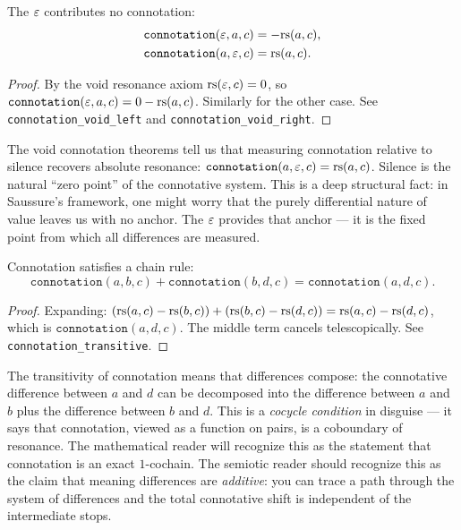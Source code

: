 \begin{theorem}
\label{thm:connotation-void}
The $\varepsilon$ contributes no connotation:
\begin{align}
  \texttt{connotation}(\varepsilon, a, c) &= -\mathrm{rs}(a, c), \\
  \texttt{connotation}(a, \varepsilon, c) &= \mathrm{rs}(a, c).
\end{align}
\end{theorem}

\begin{proof}
By the void resonance axiom $\mathrm{rs}(\varepsilon, c) = 0$, so
$\texttt{connotation}(\varepsilon, a, c) = 0 - \mathrm{rs}(a, c)$. Similarly for
the other case. See \texttt{connotation\_void\_left} and
\texttt{connotation\_void\_right}.
\end{proof}

\begin{interpretation}
The void connotation theorems tell us that measuring connotation
relative to silence recovers absolute resonance:
$\texttt{connotation}(a, \varepsilon, c) = \mathrm{rs}(a, c)$. Silence is the
natural ``zero point'' of the connotative system. This is a deep
structural fact: in Saussure's framework, one might worry that the
purely differential nature of value leaves us with no anchor. The
$\varepsilon$ provides that anchor --- it is the fixed point from which all
differences are measured.
\end{interpretation}

\begin{theorem}
\label{thm:connotation-transitive}
Connotation satisfies a chain rule:
\[
  \texttt{connotation}(a, b, c) + \texttt{connotation}(b, d, c)
  = \texttt{connotation}(a, d, c).
\]
\end{theorem}

\begin{proof}
Expanding:
$(\mathrm{rs}(a,c) - \mathrm{rs}(b,c)) + (\mathrm{rs}(b,c) - \mathrm{rs}(d,c)) = \mathrm{rs}(a,c) - \mathrm{rs}(d,c)$,
which is $\texttt{connotation}(a, d, c)$. The middle term cancels
telescopically. See \texttt{connotation\_transitive}.
\end{proof}

\begin{interpretation}
The transitivity of connotation means that differences compose: the
connotative difference between $a$ and $d$ can be decomposed into the
difference between $a$ and $b$ plus the difference between $b$ and $d$.
This is a \emph{cocycle condition} in disguise --- it says that
connotation, viewed as a function on pairs, is a coboundary of
resonance. The mathematical reader will recognize this as the
statement that connotation is an exact $1$-cochain. The semiotic
reader should recognize this as the claim that meaning differences are
\emph{additive}: you can trace a path through the system of
differences and the total connotative shift is independent of the
intermediate stops.
\end{interpretation}

